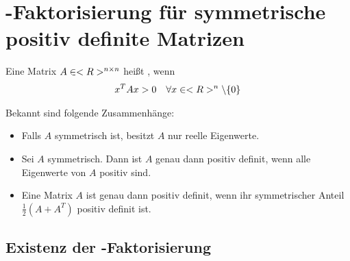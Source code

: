 \section{-Faktorisierung für symmetrische positiv definite Matrizen}

\begin{definition}
	Eine Matrix $A\in<R>^{n\times n}$ heißt , wenn
	\begin{align}
		x^TAx>0\quad\forall x\in<R>^n\backslash\{0\}\notag
	\end{align}
\end{definition}

Bekannt sind folgende Zusammenhänge:
\begin{itemize}
	\item Falls $A$ symmetrisch ist, besitzt $A$ nur reelle Eigenwerte.
	\item Sei $A$ symmetrisch. Dann ist $A$ genau dann positiv definit, wenn alle Eigenwerte von $A$ positiv sind.
	\item Eine Matrix $A$ ist genau dann positiv definit, wenn ihr symmetrischer Anteil $\frac{1}{2}(A+A^T)$ positiv definit ist.
\end{itemize}

\subsection{Existenz der -Faktorisierung}

